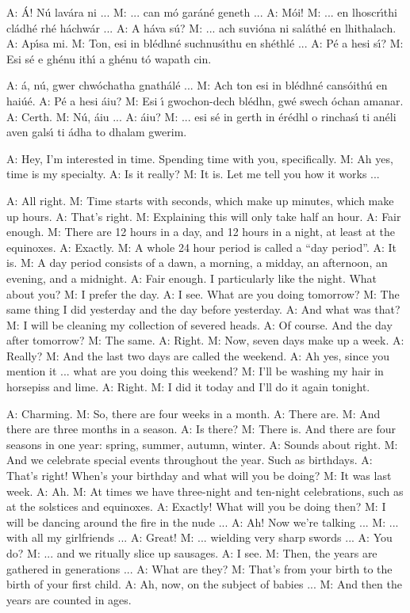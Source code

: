 A: \'{A}! N\'{u} lav\'{a}ra ni ...
M: ... can m\'{o} gar\'{a}n\'{e} geneth ...
A: M\'{o}i!
M: ... en lhoscr\'{\i}thi cl\'{a}dh\'{e} rh\'{e} h\'{a}chw\'{a}r ...
A: A h\'{a}va s\'{u}?
M: ... ach suvi\'{o}na ni sal\'{a}th\'{e} en lhithalach.
A: Ap\'{\i}sa mi.
M: Ton, esi in bl\'{e}dhn\'{e} suchnus\'{\i}thu en sh\'{e}thl\'{e} ... 
A: P\'{e} a hesi s\'{\i}?
M: Esi s\'{e} e gh\'{e}nu ith\'{\i} a gh\'{e}nu t\'{o} wapath cin.

A: \'{a}, n\'{u}, gwer chw\'{o}chatha gnath\'{a}l\'{e} ...
M: Ach ton esi in bl\'{e}dhn\'{e} cans\'{o}ith\'{u} en hai\'{u}\'{e}.
A: P\'{e} a hesi \'{a}iu?
M: Esi \'{\i} gwochon-dech bl\'{e}dhn, gw\'{e} swech \'{o}chan amanar.
A: Certh.
M: N\'{u}, \'{a}iu ...
A: \'{a}iu?
M: ... esi s\'{e} in gerth in \'{e}r\'{e}dhl o rinchas\'{\i} ti an\'{e}li aven gals\'{\i} ti \'{a}dha to dhalam gwerim.

A: Hey, I’m interested in time. Spending time with you, specifically. 
M: Ah yes, time is my specialty.
A: Is it really?
M: It is. Let me tell you how it works ...

A: All right.
M: Time starts with seconds, which make up minutes, which make up hours.
A: That’s right.
M: Explaining this will only take half an hour.
A: Fair enough.
M: There are 12 hours in a day, and 12 hours in a night, at least at the equinoxes.
A: Exactly.
M: A whole 24 hour period is called a “day period”.
A: It is.
M: A day period consists of a dawn, a morning, a midday, an afternoon, an evening, and a midnight.
A: Fair enough. I particularly like the night. What about you?
M: I prefer the day.
A: I see. What are you doing tomorrow?
M: The same thing I did yesterday and the day before yesterday.
A: And what was that?
M: I will be cleaning my collection of severed heads.
A: Of course. And the day after tomorrow?
M: The same.
A: Right.
M: Now, seven days make up a week.
A: Really?
M: And the last two days are called the weekend.
A: Ah yes, since you mention it ... what are you doing this weekend?
M: I’ll be washing my hair in horsepiss and lime.
A: Right.
M: I did it today and I’ll do it again tonight.

A: Charming.
M: So, there are four weeks in a month.
A: There are.
M: And there are three months in a season.
A: Is there?
M: There is. And there are four seasons in one year: spring, summer, autumn, winter.
A: Sounds about right.
M: And we celebrate special events throughout the year. Such as birthdays.
A: That’s right! When’s your birthday and what will you be doing?
M: It was last week.
A: Ah.
M: At times we have three-night and ten-night celebrations, such as at the solstices and equinoxes.
A: Exactly! What will you be doing then?
M: I will be dancing around the fire in the nude ...
A: Ah! Now we’re talking ...
M: ... with all my girlfriends ...
A: Great!
M: ... wielding very sharp swords ...
A: You do?
M: ... and we ritually slice up sausages.
A: I see.
M: Then, the years are gathered in generations ...
A: What are they?
M: That’s from your birth to the birth of your first child.
A: Ah, now, on the subject of babies ...
M: And then the years are counted in ages.

